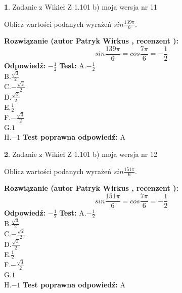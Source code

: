\documentclass[12pt, a4paper]{article}
\theoremstyle{definition} %
\newtheorem{zad}{}
\newcommand{\zadStart}[1]{\begin{zad}#1\newline}
\newcommand{\zadStop}{\end{zad}}
\newcommand{\rozwStart}[2]{\noindent \textbf{Rozwiązanie (autor #1 , recenzent #2): }\newline}
\newcommand{\rozwStop}{\newline}
\newcommand{\odpStart}{\noindent \textbf{Odpowiedź:}\newline}
\newcommand{\odpStop}{\newline}
\newcommand{\testStart}{\noindent \textbf{Test:}\newline}
\newcommand{\testStop}{\newline}
\newcommand{\kluczStart}{\noindent \textbf{Test poprawna odpowiedź:}\newline}
\newcommand{\kluczStop}{\newline}
\begin{document}
\zadStart{Zadanie z Wikieł Z 1.101 b) moja wersja nr 11}

Oblicz wartości podanych wyrażeń $sin \frac{139\pi}{6}$.
\zadStop
\rozwStart{Patryk Wirkus}{}
$$sin \frac{139\pi}{6} = cos \frac{7\pi}{6} = -\frac{1}{2}$$
\rozwStop
\odpStart
$-\frac{1}{2}$
\odpStop
\testStart
A.$-\frac{1}{2}$\\
B.$\frac{\sqrt{3}}{2}$\\
C.$-\frac{\sqrt{2}}{2}$\\
D.$\frac{\sqrt{3}}{2}$\\
E.$\frac{1}{2}$\\
F.$-\frac{\sqrt{3}}{2}$\\
G.$1$\\
H.$-1$
\testStop
\kluczStart
A
\kluczStop



\zadStart{Zadanie z Wikieł Z 1.101 b) moja wersja nr 12}

Oblicz wartości podanych wyrażeń $sin \frac{151\pi}{6}$.
\zadStop
\rozwStart{Patryk Wirkus}{}
$$sin \frac{151\pi}{6} = cos \frac{7\pi}{6} = -\frac{1}{2}$$
\rozwStop
\odpStart
$-\frac{1}{2}$
\odpStop
\testStart
A.$-\frac{1}{2}$\\
B.$\frac{\sqrt{3}}{2}$\\
C.$-\frac{\sqrt{2}}{2}$\\
D.$\frac{\sqrt{3}}{2}$\\
E.$\frac{1}{2}$\\
F.$-\frac{\sqrt{3}}{2}$\\
G.$1$\\
H.$-1$
\testStop
\kluczStart
A
\kluczStop
\end{document}

